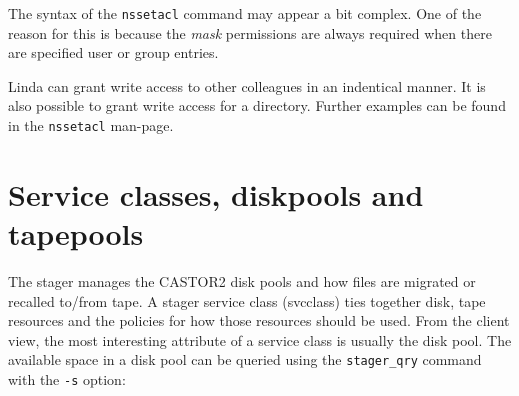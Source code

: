 The syntax of the {\tt nssetacl} command may appear a bit complex. One of the reason for this is
because the {\em mask} permissions are always required when there are specified user or group
entries.

Linda can grant write access to other colleagues in an indentical manner. It is also possible
to grant write access for a directory. Further examples can be found in the {\tt nssetacl}
man-page.

\section{Service classes, diskpools and tapepools}
\label{section:svcclass}
The stager manages the CASTOR2 disk pools and how files are migrated or recalled to/from tape.
A stager service class (svcclass) ties together disk, tape resources and the policies for how
those resources should be used. From the client view, the most interesting attribute of a
service class is usually the disk pool. The available space in a disk pool can be queried using
the {\tt stager\_qry} command with the {\tt -s} option:
\small
